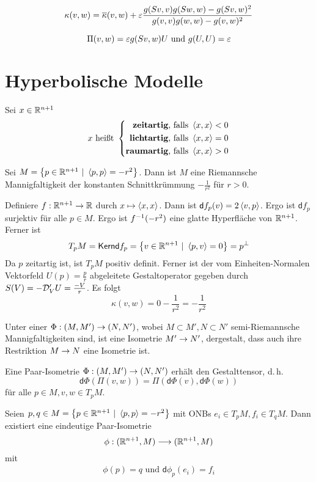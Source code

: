 \documentclass{book}
\renewcommand{\d}{\textsf{d}}
\renewcommand{\l}[1]{\overline{#1}}
\begin{document}
\Kor{}
\[ \kappa(v,w) = \l{\kappa}(v,w) + \e \frac{g(Sv,v)g(Sw,w) - g(Sv,w)^2}{g(v,v) g(w,w) - g(v,w)^2} \]
\begin{Beweis}{}
\[ \Pi(v,w) = \varepsilon g(Sv,w) U \text{ und } g(U,U) = \varepsilon \]
\end{Beweis}

\newpage
\section{Hyperbolische Modelle}
Sei $x \in \mathbb{R}^{n+1}$
\begin{align*}
x \text{ heißt } \left\lbrace \begin{aligned}
\text{\df{zeitartig}, falls } &\shrp{x,x} < 0\\
\text{\df{lichtartig}, falls } &\shrp{x,x} = 0\\
\text{\df{raumartig}, falls } &\shrp{x,x} > 0
\end{aligned} \right.
\end{align*}

\Prop{}
Sei $M = \set{p \in \R^{n+1}}{\shrp{p,p} = -r^2}$. Dann ist $M$ eine Riemannsche Mannigfaltigkeit der konstanten Schnittkrümmung $-\frac{1}{r^2}$ für $r > 0$.
\begin{Beweis}{}
Definiere $f : \mathbb{R}^{n+1} \overset{}{\rightarrow} \mathbb{R}$ durch $x \mapsto \left<x,x\right>$. Dann ist $\d f_p(v) = 2\shrp{v,p}$. Ergo ist $\d f_p$ surjektiv für alle $p \in M$. Ergo ist $f^{-1}(-r^2)$ eine glatte Hyperfläche von $\mathbb{R}^{n+1}$.\\
Ferner ist
\[ T_pM = \Ker \d f_p  = \set{v \in \R^{n+1}}{\shrp{p,v} = 0} = p^\bot \]
Da $p$ zeitartig ist, ist $T_pM$ positiv definit. Ferner ist der vom Einheiten-Normalen Vektorfeld $U(p) = \frac{p}{r}$ abgeleitete Gestaltoperator gegeben durch $S(V) = - \mathcal{D}'_VU = \frac{-V}{r}$. Es folgt
\[ \kappa(v,w) = 0 - \frac{1}{r^2} = - \frac{1}{r^2} \] 
\end{Beweis}

\Def{}
Unter einer  $\Phi : (M,M') \overset{}{\rightarrow} (N,N')$, wobei $M \subset M', N \subset N'$ semi-Riemannsche Mannigfaltigkeiten sind, ist eine Isometrie $M' \overset{}{\rightarrow} N'$, dergestalt, dass auch ihre Restriktion $M \overset{}{\rightarrow} N$ eine Isometrie ist.

\Lem{}
Eine Paar-Isometrie $\Phi : (M,M') \overset{}{\rightarrow} (N,N')$ erhält den Gestalttensor, d.\,h.
\[ \d \Phi (\Pi (v,w)) = \Pi ( \d \Phi(v),\d \Phi(w) ) \]
für alle $p \in M, v,w \in T_pM$.

\Prop{}
Seien $p,q \in M = \set{p \in \R^{n+1}}{\shrp{p,p} = -r^2}$ mit ONBs $e_i \in T_pM, f_i \in T_qM$. Dann existiert eine eindeutige Paar-Isometrie
\[ \phi : (\mathbb{R}^{n+1}, M) \overset{}{\longrightarrow} (\mathbb{R}^{n+1}, M) \]
mit
\begin{align*}
\phi(p) = q \text{ und } \d \phi_p(e_i) = f_i
\end{align*}
\end{document}
